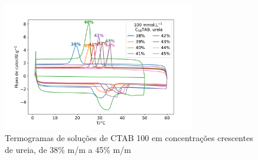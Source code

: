 		\begin{figure}[h]
			\centering
			\includegraphics[width=0.75\textwidth]{./imagens/dsc/CTAB_porc_ur}
			\caption{Termogramas de soluções de CTAB 100 \mM{} em concentrações crescentes de ureia, de 38\% m/m a 45\% m/m}
			\label{fig:DSC_CTAB_UR38-45}
		\end{figure}
		
